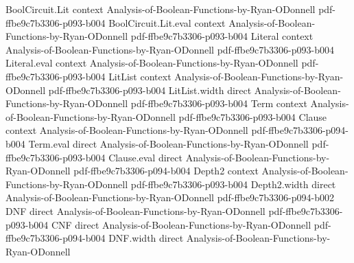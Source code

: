 \begin{theorem}
\label{RestrictionFourier.expectation_fourierCoeff_sq_restrictBF}
\leanok
{}
\proofstep
  {BoolCircuit.Lit}
  {context}
  {Analysis-of-Boolean-Functions-by-Ryan-ODonnell}
  {pdf-ffbe9c7b3306-p093-b004}
\proofstep
  {BoolCircuit.Lit.eval}
  {context}
  {Analysis-of-Boolean-Functions-by-Ryan-ODonnell}
  {pdf-ffbe9c7b3306-p093-b004}
\proofstep
  {Literal}
  {context}
  {Analysis-of-Boolean-Functions-by-Ryan-ODonnell}
  {pdf-ffbe9c7b3306-p093-b004}
\proofstep
  {Literal.eval}
  {context}
  {Analysis-of-Boolean-Functions-by-Ryan-ODonnell}
  {pdf-ffbe9c7b3306-p093-b004}
\proofstep
  {LitList}
  {context}
  {Analysis-of-Boolean-Functions-by-Ryan-ODonnell}
  {pdf-ffbe9c7b3306-p093-b004}
\proofstep
  {LitList.width}
  {direct}
  {Analysis-of-Boolean-Functions-by-Ryan-ODonnell}
  {pdf-ffbe9c7b3306-p093-b004}
\proofstep
  {Term}
  {context}
  {Analysis-of-Boolean-Functions-by-Ryan-ODonnell}
  {pdf-ffbe9c7b3306-p093-b004}
\proofstep
  {Clause}
  {context}
  {Analysis-of-Boolean-Functions-by-Ryan-ODonnell}
  {pdf-ffbe9c7b3306-p094-b004}
\proofstep
  {Term.eval}
  {direct}
  {Analysis-of-Boolean-Functions-by-Ryan-ODonnell}
  {pdf-ffbe9c7b3306-p093-b004}
\proofstep
  {Clause.eval}
  {direct}
  {Analysis-of-Boolean-Functions-by-Ryan-ODonnell}
  {pdf-ffbe9c7b3306-p094-b004}
\proofstep
  {Depth2}
  {context}
  {Analysis-of-Boolean-Functions-by-Ryan-ODonnell}
  {pdf-ffbe9c7b3306-p093-b004}
\proofstep
  {Depth2.width}
  {direct}
  {Analysis-of-Boolean-Functions-by-Ryan-ODonnell}
  {pdf-ffbe9c7b3306-p094-b002}
\proofstep
  {DNF}
  {direct}
  {Analysis-of-Boolean-Functions-by-Ryan-ODonnell}
  {pdf-ffbe9c7b3306-p093-b004}
\proofstep
  {CNF}
  {direct}
  {Analysis-of-Boolean-Functions-by-Ryan-ODonnell}
  {pdf-ffbe9c7b3306-p094-b004}
\proofstep
  {DNF.width}
  {direct}
  {Analysis-of-Boolean-Functions-by-Ryan-ODonnell}

\end{theorem}
